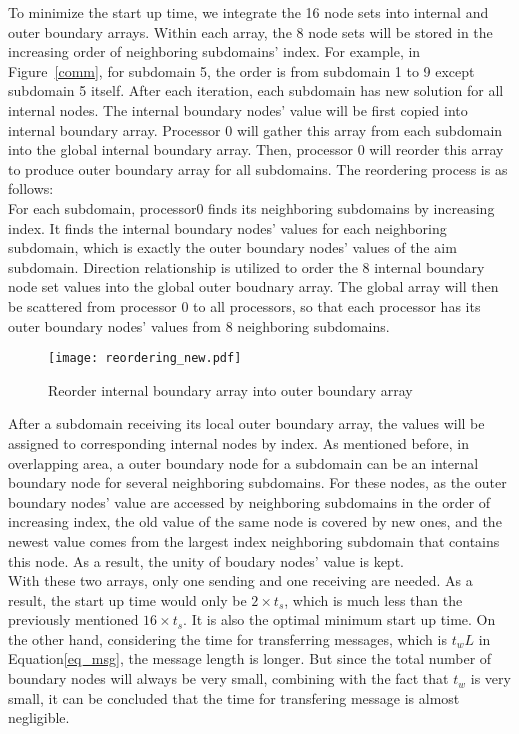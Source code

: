 \documentclass{sig-alternate}
\begin{document}
	To minimize the start up time, we integrate the 16 node sets into internal and outer boundary arrays. 
	Within each array, the 8 node sets will be stored in the increasing order of neighboring subdomains' index. 
	For example, in Figure~\ref{comm}, for subdomain 5, the order is from subdomain 1 to 9 
	except subdomain 5 itself. After each iteration, each subdomain has new solution for all internal nodes. The internal 
	boundary nodes' value will be first copied into internal boundary array. Processor 0 will gather this array from each subdomain
	into the global internal boundary array. Then, processor 0 will reorder this array to produce outer boundary array 
	for all subdomains. The reordering process is as follows: \\

	For each subdomain, processor0 finds its neighboring subdomains by increasing index. It finds the internal boundary 
	nodes' values for each neighboring subdomain, which is exactly the outer boundary nodes' values of the aim subdomain. Direction 
	relationship is utilized to order the 8 internal boundary node set values into the global outer boudnary array. The 
	global array will then be scattered from processor 0 to all processors, so that each processor has its outer boundary nodes'
	values from 8 neighboring subdomains.\\ 
	\begin{figure}[htbp]
	  \centering
	  \texttt{[image: reordering\_new.pdf]}
	  \caption{Reorder internal boundary array into outer boundary array}
	  \label{Fig4}
	\end{figure}

	After a subdomain receiving its local outer boundary array, the values will be assigned to corresponding internal nodes by 
	index. As mentioned before, in overlapping area, a outer boundary node for a subdomain can be an internal boundary node for 
	several neighboring subdomains. For these nodes, as the outer boundary nodes' value are accessed by neighboring subdomains 
	in the order of increasing index, the old value of the same node is covered by new ones, and the newest value
	comes from the largest index neighboring subdomain that contains this node. As a result, the unity of boudary nodes' value 
	is kept.\\  
	
	With these two arrays, only one sending and one receiving are needed. As a result, the start up time would only be $2\times 
	t_s$, which is much less than the previously mentioned $16\times t_s$. It is also the optimal minimum start up time. On the other
	hand, considering the time for transferring messages, which is $t_wL$ in Equation\eqref{eq_msg}, the message length is longer.
	But since the total number of boundary nodes will always be very small, combining with the fact that $t_w$ is very small, 
	it can be concluded that the time for transfering message is almost negligible.\\ 
\end{document}
